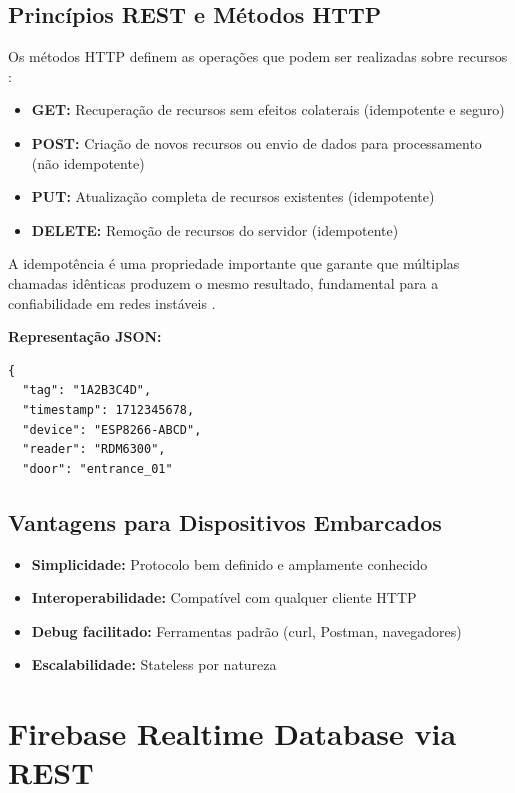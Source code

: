 \subsection{Princípios REST e Métodos HTTP}

Os métodos HTTP definem as operações que podem ser realizadas sobre recursos \cite{mdn-http-methods}:

\begin{itemize}
\item \textbf{GET:} Recuperação de recursos sem efeitos colaterais (idempotente e seguro)
\item \textbf{POST:} Criação de novos recursos ou envio de dados para processamento (não idempotente)
\item \textbf{PUT:} Atualização completa de recursos existentes (idempotente)
\item \textbf{DELETE:} Remoção de recursos do servidor (idempotente)
\end{itemize}

A idempotência é uma propriedade importante que garante que múltiplas chamadas idênticas produzem o mesmo resultado, fundamental para a confiabilidade em redes instáveis \cite{restful-api-tutorial}.

\textbf{Representação JSON:}
\begin{verbatim}
{
  "tag": "1A2B3C4D",
  "timestamp": 1712345678,
  "device": "ESP8266-ABCD",
  "reader": "RDM6300",
  "door": "entrance_01"
\end{verbatim}

\subsection{Vantagens para Dispositivos Embarcados}

\begin{itemize}
\item \textbf{Simplicidade:} Protocolo bem definido e amplamente conhecido
\item \textbf{Interoperabilidade:} Compatível com qualquer cliente HTTP
\item \textbf{Debug facilitado:} Ferramentas padrão (curl, Postman, navegadores)
\item \textbf{Escalabilidade:} Stateless por natureza
\end{itemize}

\section{Firebase Realtime Database via REST}
\label{sec:firebase-rtdb}

